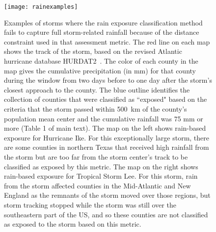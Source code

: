 \documentclass[11pt, titlepage, twoside]{article}
\begin{document}
\begin{figure}[tbhp!]
\centering
\texttt{[image: rainexamples]}
\caption{Examples of storms where the rain exposure classification method fails
to capture full storm-related rainfall because of the distance constraint used
in that assessment metric. The red line on each map shows the track of the
storm, based on the revised Atlantic hurricane database
\ac{HURDAT2}~\parencite{landsea2013}. The color of each county in the map gives the
cumulative precipitation (in \si{\milli\metre}) for that county during the window
from two days before to one day after the storm's closest approach to the
county. The blue outline identifies the collection of counties that were
classified as ``exposed" based on the criteria that the storm passed within
500~\si{\kilo\metre} of the county's population mean center and the cumulative
rainfall was 75 \si{\milli\metre} or more (Table 1 of main text). The map on the left
shows rain-based exposure for Hurricane Ike. For this exceptionally large
storm, there are some counties in northern Texas that received high rainfall
from the storm but are too far from the storm center's track to be classified
as exposed by this metric. The map on the right shows rain-based exposure for
Tropical Storm Lee. For this storm, rain from the storm affected counties in
the Mid-Atlantic and New England as the remnants of the storm moved over those
regions, but storm tracking stopped while the storm was still over the
southeastern part of the \ac{US}, and so these counties are not classified as
exposed to the storm based on this metric.}
\label{fig:rainexamples}
\end{figure}

\clearpage

\printbibliography

\cleardoublepage

\listoftodos
\end{document}
